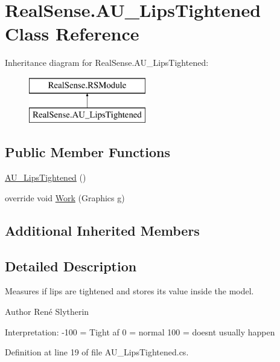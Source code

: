 \hypertarget{class_real_sense_1_1_a_u___lips_tightened}{}\section{Real\+Sense.\+A\+U\+\_\+\+Lips\+Tightened Class Reference}
\label{class_real_sense_1_1_a_u___lips_tightened}
Inheritance diagram for Real\+Sense.\+A\+U\+\_\+\+Lips\+Tightened\+:\begin{figure}[H]
\begin{center}
\leavevmode
\includegraphics[height=2.000000cm]{class_real_sense_1_1_a_u___lips_tightened}
\end{center}
\end{figure}
\subsection*{Public Member Functions}
\begin{DoxyCompactItemize}
\item 
\hyperlink{class_real_sense_1_1_a_u___lips_tightened_abcb4ab60b321ea1e7edf7f1521aa30de}{A\+U\+\_\+\+Lips\+Tightened} ()
\item 
override void \hyperlink{class_real_sense_1_1_a_u___lips_tightened_a409b75e75c7b72c628ea6479a50ed75f}{Work} (Graphics g)
\end{DoxyCompactItemize}
\subsection*{Additional Inherited Members}


\subsection{Detailed Description}
Measures if lips are tightened and stores its\textquotesingle{} value inside the model. \begin{DoxyAuthor}{Author}
René  Slytherin
\end{DoxyAuthor}
Interpretation\+: -\/100 = Tight af 0 = normal 100 = doesn\textquotesingle{}t usually happen 

Definition at line 19 of file A\+U\+\_\+\+Lips\+Tightened.\+cs.



